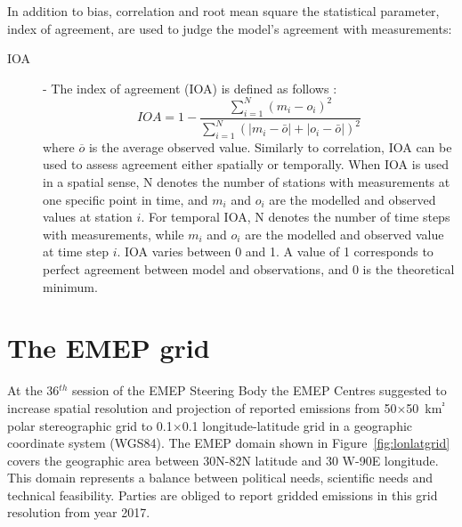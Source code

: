 In addition to bias, correlation and root mean square the statistical
parameter, index of agreement, are used to judge the model's agreement
with measurements:\\
\begin{description}
     \item[IOA]  - The index of agreement (IOA) is defined as follows
     \citep{Willmott1981, Willmott1982}:
\begin{equation}
IOA=1-\frac{\sum_{i=1}^{N}(m_i-o_i)^2}{\sum_{i=1}^{N}(|m_i-\bar{o}|+|o_i-\bar{o}|)^2}
\label{eq:IOA}
\end{equation}
     where $\overline{o}$ is the average observed value. Similarly to
     correlation, IOA can be used to assess agreement either
     spatially or temporally.
     When IOA is used in a spatial sense, N denotes the number of stations
     with measurements at one specific point in time, and $m_i$ and $o_i$
     are the modelled and observed values at station $i$.
     For temporal IOA, N denotes the number of time steps with measurements,
     while $m_i$ and $o_i$ are the modelled and observed value at time step $i$.
     IOA varies between 0 and 1. A value of 1 corresponds to perfect agreement
     between model and observations, and 0 is the theoretical minimum.

\end{description}


\section{The EMEP grid}
\label{EMEPgrid}

At the 36$^{th}$ session of the EMEP Steering Body the EMEP Centres suggested 
to increase spatial resolution and projection of reported emissions from 50$\times$50~km$^²$ polar stereographic grid to {0.1\degrees $\times$0.1\degrees} longitude-latitude grid in a geographic coordinate system 
(WGS84). The EMEP domain shown in Figure~\ref{fig:lonlatgrid} covers 
the geographic area between 30\degrees N-82\degrees N latitude and 30\degrees 
W-90\degrees E longitude. This domain 
represents a balance between political needs, scientific needs and technical 
feasibility. Parties are obliged to report gridded emissions in this grid resolution from year 2017.


